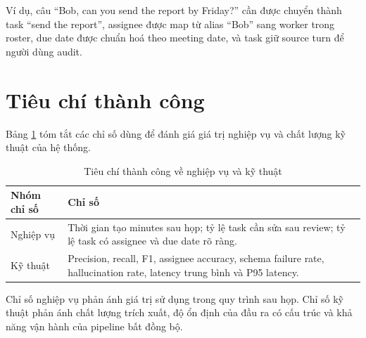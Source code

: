 Ví dụ, câu ``Bob, can you send the report by Friday?'' cần được chuyển thành task ``send the report'', assignee được map từ alias ``Bob'' sang worker trong roster, due date được chuẩn hoá theo meeting date, và task giữ source turn để người dùng audit.

\section{Tiêu chí thành công}

Bảng \ref{tab:success-metrics} tóm tắt các chỉ số dùng để đánh giá giá trị nghiệp vụ và chất lượng kỹ thuật của hệ thống.

\begin{table}[H]
\centering
\small
\caption{Tiêu chí thành công về nghiệp vụ và kỹ thuật}
\label{tab:success-metrics}
\begin{tabularx}{\textwidth}{@{}p{3.2cm}X@{}}
\toprule
\textbf{Nhóm chỉ số} & \textbf{Chỉ số} \\
\midrule
Nghiệp vụ & Thời gian tạo minutes sau họp; tỷ lệ task cần sửa sau review; tỷ lệ task có assignee và due date rõ ràng. \\
Kỹ thuật & Precision, recall, F1, assignee accuracy, schema failure rate, hallucination rate, latency trung bình và P95 latency. \\
\bottomrule
\end{tabularx}
\end{table}

Chỉ số nghiệp vụ phản ánh giá trị sử dụng trong quy trình sau họp. Chỉ số kỹ thuật phản ánh chất lượng trích xuất, độ ổn định của đầu ra có cấu trúc và khả năng vận hành của pipeline bất đồng bộ.
